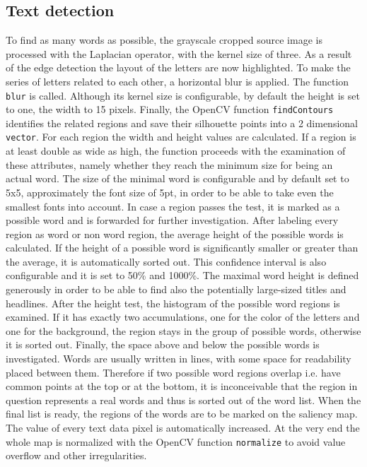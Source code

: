 \documentclass[draft,final]{vutinfth} %
\begin{document}
	\subsection{Text detection}
	To find as many words as possible, the grayscale cropped source image is processed with the Laplacian operator, with the kernel size of three.
	As a result of the edge detection the layout of the letters are now highlighted.
	To make the series of letters related to each other, a horizontal blur is applied.
	The function \texttt{blur} is called. Although its kernel size is configurable, by default the height is set to one, the width to 15 pixels.
	Finally, the OpenCV function  \texttt{findContours} identifies the related regions and save their silhouette points into a 2 dimensional \texttt{vector}.
	For each region the width and height values are calculated.
	If a region is at least double as wide as high, the function proceeds with the examination of these attributes, namely whether they reach the minimum size for being an actual word.
	The size of the minimal word is configurable and by default set to 5x5, approximately the font size of 5pt, in order to be able to take even the smallest fonts into account.
	In case a region passes the test, it is marked as a possible word and is forwarded for further investigation.
	After labeling every region as word or non word region, the average height of the possible words is calculated.
	If the height of a possible word is significantly smaller or greater than the average, it is automatically sorted out.
	This confidence interval is also configurable and it is set to 50\% and 1000\%. 
	The maximal word height is defined generously in order to be able to find also the potentially large-sized titles and headlines.
	After the height test, the histogram of the possible word regions is examined.
	If it has exactly two accumulations, one for the color of the letters and one for the background, the region stays in the group of possible words, otherwise it is sorted out.
	Finally, the space above and below the possible words is investigated.
	Words are usually written in lines, with some space for readability placed between them. 
	Therefore if two possible word regions overlap i.e. have  common points at the top or at the bottom, it is inconceivable that the region in question represents a real words and thus is sorted out of the word list.
	When the final list is ready, the regions of the words are to be marked on the saliency map.
	The value of every text data pixel is automatically increased.
	At the very end the whole map is normalized with the OpenCV function \texttt{normalize} to avoid value overflow and other irregularities.  
	
\end{document}
